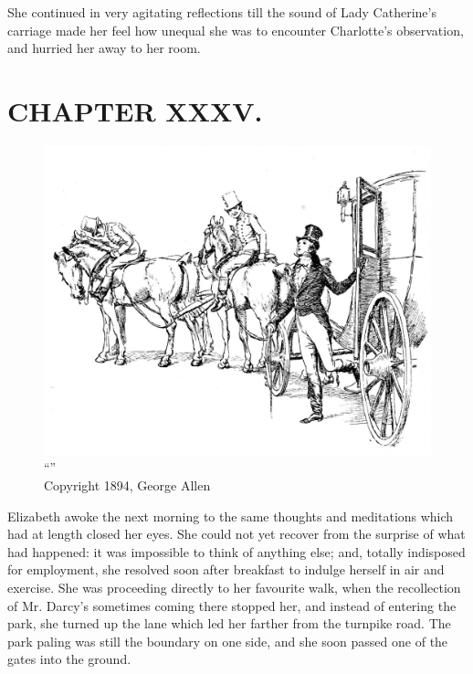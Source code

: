 She continued in very agitating reflections till the sound of Lady Catherine's carriage made her feel how unequal she was to encounter Charlotte's observation, and hurried her away to her room.



\chapter{CHAPTER XXXV.}

\begin{figure}[htbp]
    \centering
    \includegraphics[width=\textwidth]{illustrations/i_031.jpg}
    \caption{“”\\ Copyright 1894, George Allen}
    \label{fig:image}
\end{figure}


Elizabeth awoke the next morning to the same thoughts and meditations which had at length closed her eyes. She could not yet recover from the surprise of what had happened: it was impossible to think of anything else; and, totally indisposed for employment, she resolved soon after breakfast to indulge herself in air and exercise. She was proceeding directly to her favourite walk, when the recollection of Mr. Darcy's sometimes coming there stopped her, and instead of entering the park, she turned up the lane which led her farther from the turnpike road. The park paling was still the boundary on one side, and she soon passed one of the gates into the ground.

